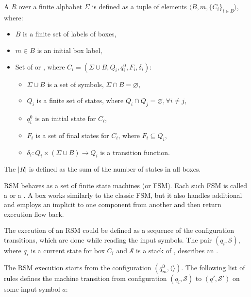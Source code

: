 \begin{definition}
A  $R$ over a finite alphabet $\Sigma$ is defined as a tuple of elements $\langle B,m,\{C_i\}_{i \in B} \rangle$, where:

\begin{itemize}
    \item $B$ is a finite set of labels of boxes,
    \item $m \in B$ is an initial box label,
    \item Set of  or ,
          where $C_i=(\Sigma \cup B, Q_i,q_i^0,F_i,\delta_i)$:
    \begin{itemize}
        \item $\Sigma \cup B$ is a set of symbols, $\Sigma \cap B = \varnothing$,
        \item $Q_i$ is a finite set of states,
              where $Q_i \cap Q_j =  \varnothing, \forall i \neq j$,
        \item $q_i^0$ is an initial state for $C_i$,
        \item $F_i$ is a set of final states for $C_i$, where $F_i \subseteq Q_i$,
        \item $\delta_i: Q_i \times (\Sigma \cup B) \to Q_i$ is a transition function. %
    \end{itemize}
\end{itemize}

\end{definition}

\begin{definition}
    The  $|R|$ is defined as the sum of the number of states in all boxes.
\end{definition}

RSM behaves as a set of finite state machines (or FSM).
Each such FSM is called a  or a .
A box works similarly to the classic FSM, but it also handles additional  and employs an implicit  to  one component from another and then return execution flow back.

The execution of an RSM could be defined as a sequence of the configuration transitions, which are done while reading the input symbols.
The pair $(q_i,\mathcal{S})$, where $q_i$ is a current state for box $C_i$ and $\mathcal{S}$ is  a stack of , describes an .

The RSM execution starts from the configuration $(q_m^0, \langle\rangle)$.
The following list of rules defines the machine transition from configuration $(q_i,\mathcal{S})$ to $(q',\mathcal{S}')$ on some input symbol $a$:

